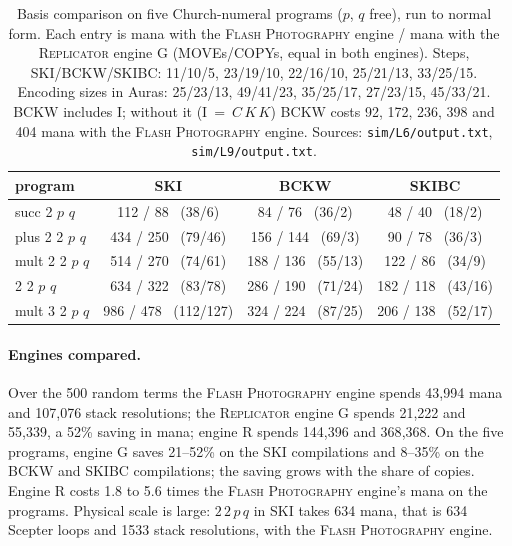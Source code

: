 \documentclass[11pt]{article}
\theoremstyle{definition}
\newcommand{\card}[1]{{\mdseries\scshape #1}}
\begin{document}
\begin{table}[t]
\centering\small
\begin{tabular}{@{}lccc@{}}
\toprule
program & SKI & BCKW & SKIBC\\
\midrule
succ 2 $p$ $q$   & 112 / \phantom{0}88 \ (38/6)\phantom{00}   & \phantom{0}84 / \phantom{0}76 \ (36/2)\phantom{0} & \phantom{0}48 / \phantom{0}40 \ (18/2)\phantom{0}\\
plus 2 2 $p$ $q$ & 434 / 250 \ (79/46)\phantom{0}  & 156 / 144 \ (69/3)\phantom{0} & \phantom{0}90 / \phantom{0}78 \ (36/3)\phantom{0}\\
mult 2 2 $p$ $q$ & 514 / 270 \ (74/61)\phantom{0}  & 188 / 136 \ (55/13) & 122 / \phantom{0}86 \ (34/9)\phantom{0}\\
2 2 $p$ $q$      & 634 / 322 \ (83/78)\phantom{0}  & 286 / 190 \ (71/24) & 182 / 118 \ (43/16)\\
mult 3 2 $p$ $q$ & 986 / 478 \ (112/127)          & 324 / 224 \ (87/25) & 206 / 138 \ (52/17)\\
\bottomrule
\end{tabular}
\caption{Basis comparison on five Church-numeral programs ($p$, $q$ free), run to normal
form. Each entry is mana with the \card{Flash Photography} engine / mana with the
\card{Replicator} engine G (MOVEs/COPYs, equal in both engines). Steps, SKI/BCKW/SKIBC:
11/10/5, 23/19/10, 22/16/10, 25/21/13, 33/25/15. Encoding sizes in Auras: 25/23/13,
49/41/23, 35/25/17, 27/23/15, 45/33/21. BCKW includes I; without it (I~=~$C\,K\,K$) BCKW
costs 92, 172, 236, 398 and 404 mana with the \card{Flash Photography} engine. Sources:
\texttt{sim/L6/output.txt}, \texttt{sim/L9/output.txt}.}\label{tab:basis}
\end{table}

\paragraph{Engines compared.} Over the 500 random terms the \card{Flash Photography} engine
spends 43{,}994 mana and 107{,}076 stack resolutions; the \card{Replicator} engine G spends
21{,}222 and 55{,}339, a 52\% saving in mana; engine R spends 144{,}396 and 368{,}368. On the
five programs, engine G saves 21--52\% on the SKI compilations and 8--35\% on the BCKW and
SKIBC compilations; the saving grows with the share of copies. Engine R costs 1.8 to 5.6
times the \card{Flash Photography} engine's mana on the programs. Physical scale is large:
$2\,2\,p\,q$ in SKI takes 634 mana, that is 634 Scepter loops and 1533 stack resolutions,
with the \card{Flash Photography} engine.
\end{document}
